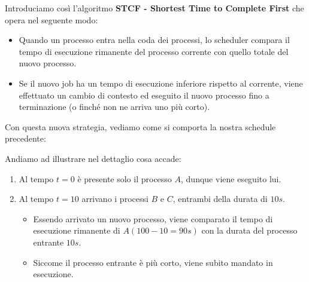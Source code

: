\documentclass[12pt]{report}
\begin{document}
	Introduciamo così l'algoritmo \textbf{STCF - Shortest Time to Complete First} che opera nel seguente modo:
	\begin{itemize}
		\item Quando un processo entra nella coda dei processi, lo scheduler compara il tempo di esecuzione rimanente del processo corrente con quello totale del nuovo processo.
		
		\item Se il nuovo job ha un tempo di esecuzione inferiore rispetto al corrente, viene effettuato un cambio di contesto ed eseguito il nuovo processo fino a terminazione (o finché non ne arriva uno più corto).
	\end{itemize}
	Con questa nuova strategia, vediamo come si comporta la nostra schedule precedente:
	\begin{figure}[htbp]
		\centering
	\end{figure}
	Andiamo ad illustrare nel dettaglio cosa accade:
	\begin{enumerate}
		\item Al tempo $t=0$ è presente solo il processo $A$, dunque viene eseguito lui.
		
		\item Al tempo $t=10$ arrivano i processi $B$ e $C$, entrambi della durata di $10s$.
		\begin{itemize}
			\item Essendo arrivato un nuovo processo, viene comparato il tempo di esecuzione rimanente di $A (100-10 = 90s)$ con la durata del processo entrante $10s$.
			
			\item Siccome il processo entrante è più corto, viene subito mandato in esecuzione.
		\end{itemize}
	\end{enumerate}
\end{document}
